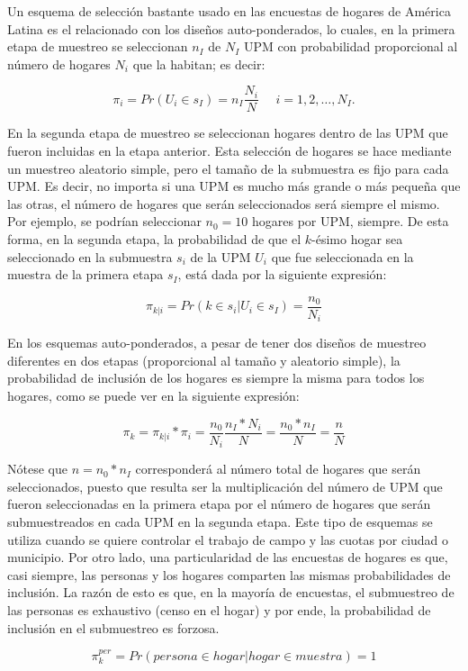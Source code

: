 \documentclass[
  12pt,
  spanish,
]{book}
\begin{document}
Un esquema de selección bastante usado en las encuestas de hogares de América Latina es el relacionado con los diseños auto-ponderados, lo cuales, en la primera etapa de muestreo se seleccionan \(n_I\) de \(N_I\) UPM con probabilidad proporcional al número de hogares \(N_i\) que la habitan; es decir:

\[
\pi_i = Pr(U_i \in s_I) = n_I \frac{N_i}{N} \ \ \ \ \ \ i = 1, 2, \ldots, N_I.
\]

En la segunda etapa de muestreo se seleccionan hogares dentro de las UPM que fueron incluidas en la etapa anterior. Esta selección de hogares se hace mediante un muestreo aleatorio simple, pero el tamaño de la submuestra es fijo para cada UPM. Es decir, no importa si una UPM es mucho más grande o más pequeña que las otras, el número de hogares que serán seleccionados será siempre el mismo. Por ejemplo, se podrían seleccionar \(n_0 = 10\) hogares por UPM, siempre. De esta forma, en la segunda etapa, la probabilidad de que el \(k\)-ésimo hogar sea seleccionado en la submuestra \(s_i\) de la UPM \(U_i\) que fue seleccionada en la muestra de la primera etapa \(s_I\), está dada por la siguiente expresión:

\[
\pi_{k|i} = Pr(k \in s_i | U_i \in s_I ) = \frac{n_0}{N_i}
\]

En los esquemas auto-ponderados, a pesar de tener dos diseños de muestreo diferentes en dos etapas (proporcional al tamaño y aleatorio simple), la probabilidad de inclusión de los hogares es siempre la misma para todos los hogares, como se puede ver en la siguiente expresión:

\[\pi_k = \pi_{k|i} * \pi_i = \frac{n_0}{N_i} \frac{n_I* N_i}{N} = \frac{n_0*n_I}{N} = \frac{n}{N}\]

Nótese que \(n = n_0 * n_I\) corresponderá al número total de hogares que serán seleccionados, puesto que resulta ser la multiplicación del número de UPM que fueron seleccionadas en la primera etapa por el número de hogares que serán submuestreados en cada UPM en la segunda etapa. Este tipo de esquemas se utiliza cuando se quiere controlar el trabajo de campo y las cuotas por ciudad o municipio. Por otro lado, una particularidad de las encuestas de hogares es que, casi siempre, las personas y los hogares comparten las mismas probabilidades de inclusión. La razón de esto es que, en la mayoría de encuestas, el submuestreo de las personas es exhaustivo (censo en el hogar) y por ende, la probabilidad de inclusión en el submuestreo es forzosa.

\[
\pi_k^{per} = Pr(persona \in hogar | hogar \in muestra) =  1
\]
\end{document}
